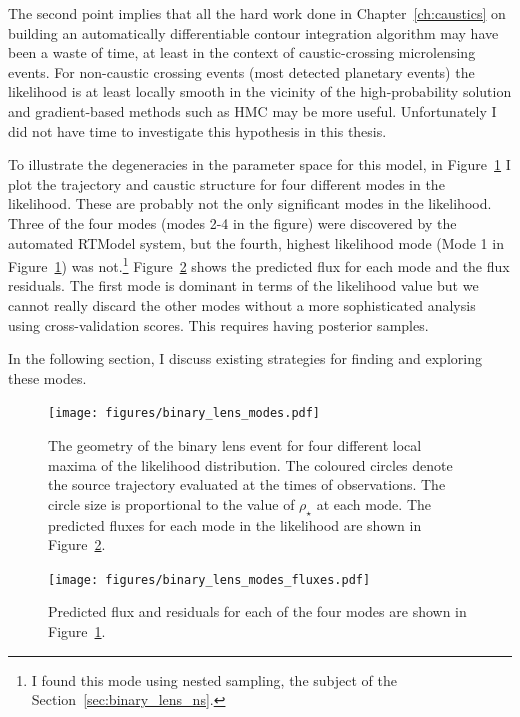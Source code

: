 \documentclass[12pt,dvipsnames]{report}
\begin{document}
The second point implies that all the hard work done in Chapter~\ref{ch:caustics} on building
an automatically differentiable contour integration algorithm may have been a waste of time, 
at least in the context of caustic-crossing microlensing events. For non-caustic crossing 
events (most detected planetary events) the likelihood is at least locally smooth in the 
vicinity of the high-probability solution and gradient-based methods
such as HMC may be more useful. Unfortunately I did not have time to investigate this 
hypothesis in this thesis.

To illustrate the degeneracies in the parameter space for this model, in 
Figure~\ref{fig:binary_lens_modes} I plot the 
trajectory and caustic structure for four different modes in the likelihood.
 These are probably not the only significant modes in the likelihood. 
Three of the four modes (modes 2-4 in the figure) were discovered by the automated RTModel 
system, but the fourth, highest likelihood mode (Mode 1 in Figure~\ref{fig:binary_lens_modes}) 
was not.\footnote{I found this mode using nested sampling, the subject of the 
Section~\ref{sec:binary_lens_ns}.} Figure~\ref{fig:binary_lens_modes_fluxes} 
shows the predicted flux for each mode and the flux residuals. 
The first mode is dominant in terms of the likelihood value but we cannot really
discard the other modes without a more sophisticated analysis using cross-validation
scores. This requires having posterior samples.

In the following section, I discuss existing strategies for finding and exploring these 
modes.
\begin{figure}[t]
    \begin{centering}
        \texttt{[image: figures/binary\_lens\_modes.pdf]}
        \caption{
            The geometry of the binary lens event for four different local maxima of the likelihood
            distribution. The coloured circles denote the source trajectory evaluated at 
            the times of observations. The circle size is proportional to the value of 
            $\rho_\star$ at each mode. The predicted fluxes for each mode in the likelihood 
            are shown in Figure~\ref{fig:binary_lens_modes_fluxes}.
        }
            \label{fig:binary_lens_modes}
    \end{centering}
\end{figure}

\begin{figure}[t]
    \begin{centering}
        \texttt{[image: figures/binary\_lens\_modes\_fluxes.pdf]}
        \caption{
            Predicted flux and residuals for each of the four modes are shown in 
            Figure~\ref{fig:binary_lens_modes}.
        }
            \label{fig:binary_lens_modes_fluxes}
    \end{centering}
\end{figure}
\end{document}
